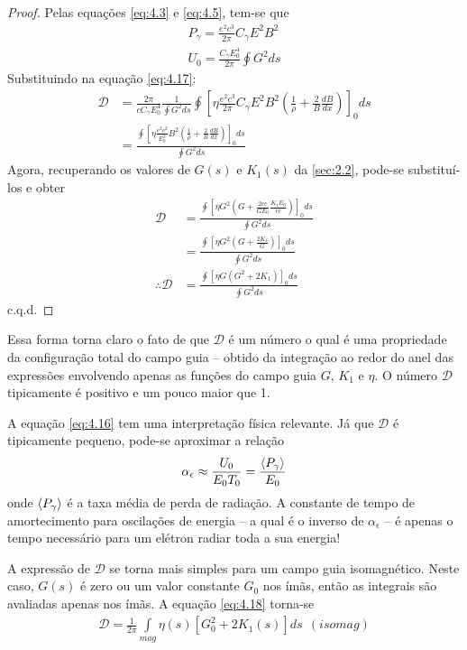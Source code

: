 \begin{proof}
	Pelas equações \eqref{eq:4.3} e \eqref{eq:4.5}, tem-se que
	\begin{align*}
		P_\gamma = \frac{e^2c^3}{2\pi}C_\gamma E^2B^2\\
		U_0 = \frac{C_\gamma E_0^4}{2\pi}\oint G^2 ds
	\end{align*}
	Substituindo na equação \eqref{eq:4.17}:
	\begin{align*}
		\mathscr{D} &= \frac{2\pi}{c C_\gamma E_0^4}\frac{1}{\oint G^2 ds}\oint \left[\eta \frac{e^2c^3}{2\pi}C_\gamma E^2B^2 \left(\frac{1}{\rho}+\frac{2}{B}\frac{dB}{dx}\right)\right]_0 ds\\
					&= \frac{\oint \left[\eta \frac{e^2c^2}{E_0^2} B^2 \left(\frac{1}{\rho}+\frac{2}{B}\frac{dB}{dx}\right)\right]_0 ds}{\oint G^2 ds}
	\end{align*}
	Agora, recuperando os valores de $G(s)$ e $K_1(s)$ da \autoref{sec:2.2}, pode-se substituí-los e obter
	\begin{align*}
		\mathscr{D} &= \frac{\oint \left[\eta G^2 \left(G +\frac{2ec}{G E_0}\frac{K_1 E_0}{ec}\right)\right]_0 ds}{\oint G^2 ds}\\
					&= \frac{\oint \left[\eta G^2 \left(G +\frac{2K_1}{G}\right)\right]_0 ds}{\oint G^2 ds}\\
		\therefore \mathscr{D} &= \frac{\oint \left[\eta G \left(G^2 +2K_1\right)\right]_0 ds}{\oint G^2 ds}
	\end{align*}
	c.q.d.
\end{proof}

Essa forma torna claro o fato de que $\mathscr{D}$ é um número o qual é uma propriedade da configuração total do campo guia -- obtido da integração ao redor do anel das expressões envolvendo apenas as funções do campo guia $G$, $K_1$ e $\eta$. O número $\mathscr{D}$ tipicamente é positivo e um pouco maior que 1.

A equação \eqref{eq:4.16} tem uma interpretação física relevante. Já que $\mathscr{D}$ é tipicamente pequeno, pode-se aproximar a relação
\begin{align}
	\alpha_\epsilon \approx \frac{U_0}{E_0T_0} = \frac{\left< P_\gamma \right>}{E_0}\label{eq:4.20}
\end{align}
onde $\left< P_\gamma \right>$ é a taxa média de perda de radiação. A constante de tempo de amortecimento para oscilações de energia -- a qual é o inverso de $\alpha_\epsilon$ -- é apenas o tempo necessário para um elétron radiar toda a sua energia!

A expressão de $\mathscr{D}$ se torna mais simples para um campo guia isomagnético. Neste caso, $G(s)$ é zero ou um valor constante $G_0$ nos ímãs, então as integrais são avaliadas apenas nos ímãs. A equação \eqref{eq:4.18} torna-se
\begin{align}
	\mathscr{D} = \frac{1}{2\pi} \int\limits_{mag}^{}\eta(s)\left[G_0^2 + 2K_1(s)\right]ds\ \ (isomag)
\end{align}

